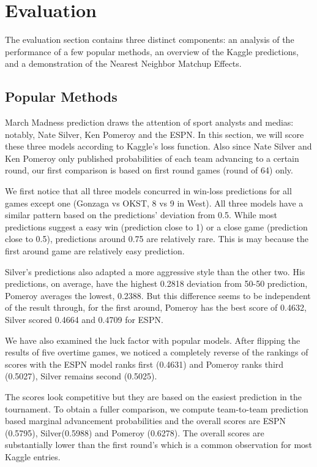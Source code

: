 \section{Evaluation}
The evaluation section contains three distinct components: an analysis of the performance of a few popular methods, an overview of the Kaggle predictions, and a demonstration of the Nearest Neighbor Matchup Effects.
\subsection{Popular Methods}
March Madness prediction draws the attention of sport analysts and medias: notably, Nate Silver, Ken Pomeroy and the ESPN. In this section, we will score these three models according to Kaggle's loss function. Also since Nate Silver and Ken Pomeroy only published probabilities of each team advancing to a certain round, our first comparison is based on first round games (round of 64) only. 
  
We first notice that all three models concurred in win-loss predictions for all games  except one (Gonzaga vs OKST, 8 vs 9 in West). All three models have a similar pattern based on the predictions' deviation from 0.5. While most predictions suggest a easy win (prediction close to 1) or a close game (prediction close to 0.5), predictions around 0.75 are relatively rare. This is may because the first around game are relatively easy prediction.

Silver's predictions also adapted a more aggressive style than the other two. His predictions, on average, have the highest 0.2818  deviation from 50-50 prediction, Pomeroy averages the lowest, 0.2388. But this difference seems to be independent of the result through, for the first around, Pomeroy has the best score of 0.4632, Silver scored 0.4664 and 0.4709 for ESPN. 

We have also examined the luck factor with popular models. After flipping the results of five overtime games, we noticed a completely reverse of the rankings of scores with the ESPN model ranks first (0.4631) and Pomeroy ranks third (0.5027), Silver remains second (0.5025).

The scores look competitive but they are based on the easiest prediction in the tournament. To obtain a fuller comparison, we compute team-to-team prediction based marginal advancement probabilities and  the overall scores are ESPN (0.5795), Silver(0.5988) and Pomeroy (0.6278). The overall scores are substantially lower than the first round's which is a common observation for most Kaggle entries.    

